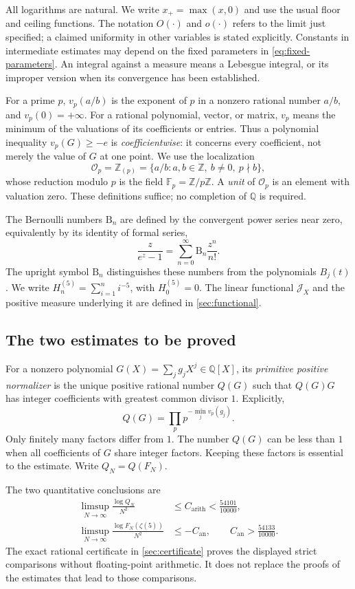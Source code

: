 \documentclass[11pt,letterpaper]{article}
\theoremstyle{definition}
\newcommand{\Q}{\mathbb Q}
\newcommand{\Z}{\mathbb Z}
\newcommand{\Fp}{\mathbb F_p}
\newcommand{\J}{\mathcal J}
\newcommand{\arith}{\mathrm{arith}}
\newcommand{\an}{\mathrm{an}}
\begin{document}
All logarithms are natural. We write $x_+=\max(x,0)$ and use the usual floor
and ceiling functions. The notation $O(\cdot)$ and $o(\cdot)$ refers to the
limit just specified; a claimed uniformity in other variables is stated
explicitly. Constants in intermediate estimates may depend on the fixed
parameters in \eqref{eq:fixed-parameters}. An integral against a measure means
a Lebesgue integral, or its improper version when its convergence has been
established.

For a prime $p$, $v_p(a/b)$ is the exponent of $p$ in a nonzero rational
number $a/b$, and $v_p(0)=+\infty$. For a rational polynomial, vector, or
matrix, $v_p$ means the minimum of the valuations of its coefficients or
entries. Thus a polynomial inequality $v_p(G)\ge -e$ is
\emph{coefficientwise}: it concerns every coefficient, not merely the value
of $G$ at one point. We use the localization
\[
 \mathcal O_p=\Z_{(p)}
 =\{a/b:a,b\in\Z,\ b\ne0,\ p\nmid b\},
\]
whose reduction modulo $p$ is the field $\Fp=\Z/p\Z$. A \emph{unit} of
$\mathcal O_p$ is an element with valuation zero. These definitions suffice;
no completion of $\Q$ is required.

The Bernoulli numbers $\mathrm B_n$ are defined by the convergent power
series near zero, equivalently by its identity of formal series,
\[
 \frac{z}{e^z-1}=\sum_{n=0}^{\infty}\mathrm B_n\frac{z^n}{n!}.
\]
The upright symbol $\mathrm B_n$ distinguishes these numbers from the
polynomials $B_j(t)$. We write
$H_n^{(5)}=\sum_{i=1}^{n}i^{-5}$, with $H_0^{(5)}=0$.
The linear functional $\J_X$ and the positive measure underlying it are
defined in \cref{sec:functional}.

\subsection{The two estimates to be proved}
For a nonzero polynomial $G(X)=\sum_jg_jX^j\in\Q[X]$, its
\emph{primitive positive normalizer} is the unique positive rational number
$Q(G)$ such that $Q(G)G$ has integer coefficients with greatest common divisor
$1$. Explicitly,
\[
 Q(G)=\prod_p p^{-\min_j v_p(g_j)}.
\]
Only finitely many factors differ from $1$. The number $Q(G)$ can be less
than $1$ when all coefficients of $G$ share integer factors. Keeping these
factors is essential to the estimate. Write $Q_N=Q(F_N)$.

The two quantitative conclusions are
\begin{align}
 \limsup_{N\to\infty}\frac{\log Q_N}{N^2}
    &\le C_{\arith}<\frac{54101}{10000},\label{eq:plan-arith}\\
 \limsup_{N\to\infty}\frac{\log F_N(\zeta(5))}{N^2}
    &\le -C_{\an},\qquad C_{\an}>\frac{54133}{10000}.
       \label{eq:plan-analytic}
\end{align}
The exact rational certificate in \cref{sec:certificate} proves the displayed
strict comparisons without floating-point arithmetic. It does not replace
the proofs of the estimates that lead to those comparisons.
\end{document}
